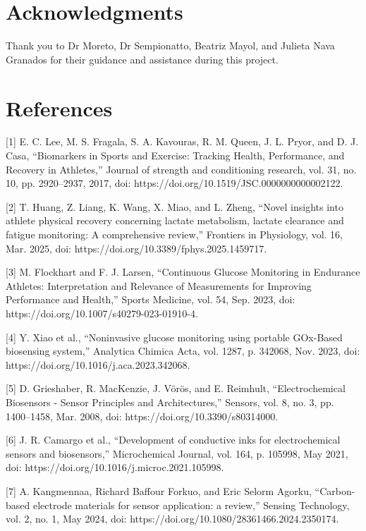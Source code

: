 \documentclass[conference]{IEEEtran}
\begin{document}
\section{Acknowledgments} 

Thank you to Dr Moreto, Dr Sempionatto, Beatriz Mayol, and Julieta Nava Granados for their guidance and assistance during this project.

\bigskip



\section{References}
[1] E. C. Lee, M. S. Fragala, S. A. Kavouras, R. M. Queen, J. L. Pryor, and D. J. Casa, “Biomarkers in Sports and Exercise: Tracking Health, Performance, and Recovery in Athletes,” Journal of strength and conditioning research, vol. 31, no. 10, pp. 2920–2937, 2017, doi: https://doi.org/10.1519/JSC.0000000000002122.

[2]  T. Huang, Z. Liang, K. Wang, X. Miao, and L. Zheng, “Novel insights into athlete physical recovery concerning lactate metabolism, lactate clearance and fatigue monitoring: A comprehensive review,” Frontiers in Physiology, vol. 16, Mar. 2025, doi: https://doi.org/10.3389/fphys.2025.1459717.

[3] M. Flockhart and F. J. Larsen, “Continuous Glucose Monitoring in Endurance Athletes: Interpretation and Relevance of Measurements for Improving Performance and Health,” Sports Medicine, vol. 54, Sep. 2023, doi: https://doi.org/10.1007/s40279-023-01910-4.

[4] Y. Xiao et al., “Noninvasive glucose monitoring using portable GOx-Based biosensing system,” Analytica Chimica Acta, vol. 1287, p. 342068, Nov. 2023, doi: https://doi.org/10.1016/j.aca.2023.342068.

‌[5] D. Grieshaber, R. MacKenzie, J. Vörös, and E. Reimhult, “Electrochemical Biosensors - Sensor Principles and Architectures,” Sensors, vol. 8, no. 3, pp. 1400–1458, Mar. 2008, doi: https://doi.org/10.3390/s80314000.


[6] J. R. Camargo et al., “Development of conductive inks for electrochemical sensors and biosensors,” Microchemical Journal, vol. 164, p. 105998, May 2021, doi: https://doi.org/10.1016/j.microc.2021.105998.

[7] A. Kangmennaa, Richard Baffour Forkuo, and Eric Selorm Agorku, “Carbon-based electrode materials for sensor application: a review,” Sensing Technology, vol. 2, no. 1, May 2024, doi: https://doi.org/10.1080/28361466.2024.2350174.
\end{document}

